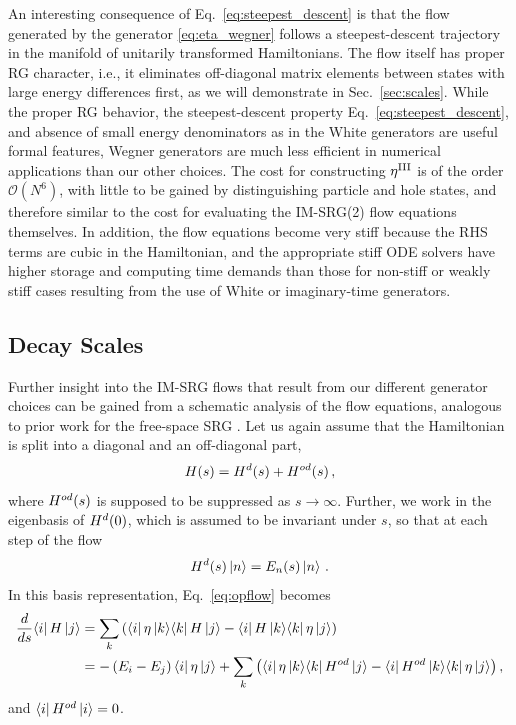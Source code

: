 An interesting consequence of Eq.~\eqref{eq:steepest_descent} is that
the flow generated by the generator \eqref{eq:eta_wegner} follows a
steepest-descent trajectory in the manifold of unitarily transformed
Hamiltonians. The flow itself has proper RG character, i.e., it
eliminates off-diagonal matrix elements between states with large
energy differences first, as we will demonstrate in
Sec.~\ref{sec:scales}. While the proper RG behavior, the
steepest-descent property Eq.~\eqref{eq:steepest_descent}, and absence
of small energy denominators as in the White generators are useful
formal features, Wegner generators are much less efficient in
numerical applications than our other choices. The cost for
constructing $\eta^\text{III}$ is of the order $\mathcal{O}(N^6)$,
with little to be gained by distinguishing particle and hole states,
and therefore similar to the cost for evaluating the IM-SRG(2) flow
equations themselves. In addition, the flow equations become very
stiff because the RHS terms are cubic in the Hamiltonian, and the
appropriate stiff ODE solvers have higher storage and computing time
demands than those for non-stiff or weakly stiff cases resulting from
the use of White or imaginary-time generators.


\subsection{\label{sec:scales}Decay Scales}
Further insight into the IM-SRG flows that result from our different generator choices can
be gained from a schematic analysis of the flow equations, analogous to prior work for
the free-space SRG \cite{Anderson:2008hx,Bogner:2010pq}.
Let us again assume that the Hamiltonian is split into a diagonal and an off-diagonal part,
\begin{equation}
  H(s)=H^d(s) + H^{od}(s)\,,
\end{equation}
where $H^{od}(s)$ is supposed to be suppressed as $s\to\infty$. Further, we work in the eigenbasis of $H^d(0)$, which is assumed to be invariant under $s$, so that at each step of the flow
\begin{equation}
  H^d(s)\ket{n} = E_n(s)\ket{n}\,.
\end{equation}
In this basis representation, Eq.~\eqref{eq:opflow} becomes
\begin{align}
   \frac{d {}} {d {s}} \langle{i}|\,{H}\,|{j}\rangle
  &=\sum_k\left(\langle{i}|\,{\eta}\,|{k}\rangle\langle{k}|\,{H}\,|{j}\rangle-\langle{i}|\,{H}\,|{k}\rangle\langle{k}|\,{\eta}\,|{j}\rangle\right)\notag\\
  &=-\left(E_i-E_j\right)\langle{i}|\,{\eta}\,|{j}\rangle
    +\sum_k\left(\langle{i}|\,{\eta}\,|{k}\rangle\langle{k}|\,{H^{od}}\,|{j}\rangle-\langle{i}|\,{H^{od}}\,|{k}\rangle\langle{k}|\,{\eta}\,|{j}\rangle\right),
\end{align}
and $\langle{i}|\,{H^{od}}\,|{i}\rangle=0$.

